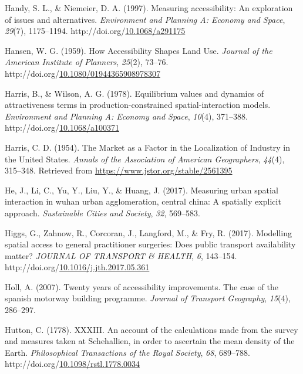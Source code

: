 \documentclass[
11pt, %
oneside, %
english, %
singlespacing, %
]{macthesis} %
\newlength{\cslhangindent}
\newenvironment{CSLReferences}[2] %
{\begin{list}{}{%
	\setlength{\itemindent}{0pt}
	\setlength{\leftmargin}{0pt}
	\setlength{\parsep}{0pt}
	\ifodd #1
	\setlength{\leftmargin}{\cslhangindent}
	\setlength{\itemindent}{-1\cslhangindent}
	\fi
	\setlength{\itemsep}{#2\baselineskip}}}
{\end{list}}
\begin{document}
\begin{CSLReferences}{1}{0}
Handy, S. L., \& Niemeier, D. A. (1997). Measuring accessibility: An exploration of issues and alternatives. \emph{Environment and Planning A: Economy and Space}, \emph{29}(7), 1175--1194. http://doi.org/\href{https://doi.org/10.1068/a291175}{10.1068/a291175}

Hansen, W. G. (1959). How Accessibility Shapes Land Use. \emph{Journal of the American Institute of Planners}, \emph{25}(2), 73--76. http://doi.org/\href{https://doi.org/10.1080/01944365908978307}{10.1080/01944365908978307}

Harris, B., \& Wilson, A. G. (1978). Equilibrium values and dynamics of attractiveness terms in production-constrained spatial-interaction models. \emph{Environment and Planning A: Economy and Space}, \emph{10}(4), 371--388. http://doi.org/\href{https://doi.org/10.1068/a100371}{10.1068/a100371}

Harris, C. D. (1954). The {Market} as a {Factor} in the {Localization} of {Industry} in the {United} {States}. \emph{Annals of the Association of American Geographers}, \emph{44}(4), 315--348. Retrieved from \url{https://www.jstor.org/stable/2561395}

He, J., Li, C., Yu, Y., Liu, Y., \& Huang, J. (2017). Measuring urban spatial interaction in wuhan urban agglomeration, central china: A spatially explicit approach. \emph{Sustainable Cities and Society}, \emph{32}, 569--583.

Higgs, G., Zahnow, R., Corcoran, J., Langford, M., \& Fry, R. (2017). Modelling spatial access to general practitioner surgeries: Does public transport availability matter? \emph{{JOURNAL} {OF} {TRANSPORT} \& {HEALTH}}, \emph{6}, 143--154. http://doi.org/\href{https://doi.org/10.1016/j.jth.2017.05.361}{10.1016/j.jth.2017.05.361}

Holl, A. (2007). Twenty years of accessibility improvements. The case of the spanish motorway building programme. \emph{Journal of Transport Geography}, \emph{15}(4), 286--297.

Hutton, C. (1778). {XXXIII}. {An} account of the calculations made from the survey and measures taken at {Schehallien}, in order to ascertain the mean density of the {Earth}. \emph{Philosophical Transactions of the Royal Society}, \emph{68}, 689--788. http://doi.org/\href{https://doi.org/10.1098/rstl.1778.0034}{10.1098/rstl.1778.0034}


\end{CSLReferences}
\end{document}
